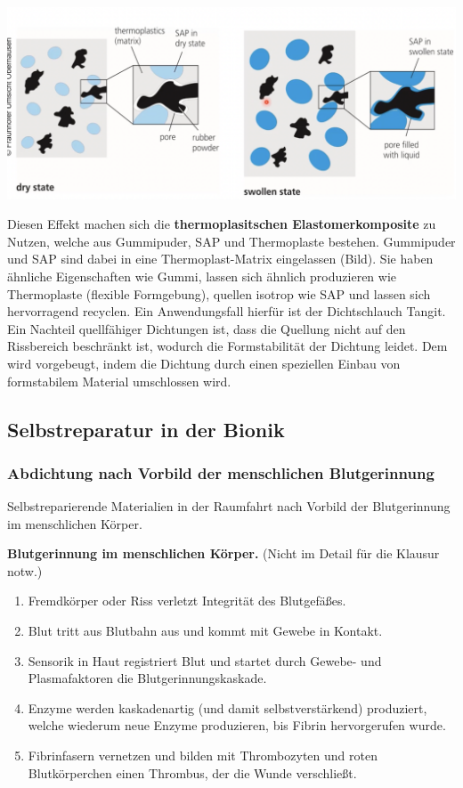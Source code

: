 \begin{center}
    \includegraphics[width=14cm]{lec5/figures/TPE.png}
\end{center}

Diesen Effekt machen sich die \textbf{thermoplasitschen Elastomerkomposite} zu Nutzen, welche aus Gummipuder, SAP und Thermoplaste bestehen. Gummipuder und SAP sind dabei in eine Thermoplast-Matrix eingelassen (Bild). Sie haben ähnliche Eigenschaften wie Gummi, lassen sich ähnlich produzieren wie Thermoplaste (flexible Formgebung), quellen isotrop wie SAP und lassen sich hervorragend recyclen. Ein Anwendungsfall hierfür ist der Dichtschlauch Tangit.\\

Ein Nachteil quellfähiger Dichtungen ist, dass die Quellung nicht auf den Rissbereich beschränkt ist, wodurch die Formstabilität der Dichtung leidet. Dem wird vorgebeugt, indem die Dichtung durch einen speziellen Einbau von formstabilem Material umschlossen wird.

\subsection{Selbstreparatur in der Bionik}

\subsubsection{Abdichtung nach Vorbild der menschlichen Blutgerinnung}

Selbstreparierende Materialien in der Raumfahrt nach Vorbild der Blutgerinnung im menschlichen Körper.

\textbf{Blutgerinnung im menschlichen Körper.} (Nicht im Detail für die Klausur notw.)

\begin{enumerate}
    \item Fremdkörper oder Riss verletzt Integrität des Blutgefäßes.
    \item Blut tritt aus Blutbahn aus und kommt mit Gewebe in Kontakt.
    \item Sensorik in Haut registriert Blut und startet durch Gewebe- und Plasmafaktoren die Blutgerinnungskaskade.
    \item Enzyme werden kaskadenartig (und damit selbstverstärkend) produziert, welche wiederum neue Enzyme produzieren, bis Fibrin hervorgerufen wurde.
    \item Fibrinfasern vernetzen und bilden mit Thrombozyten und roten Blutkörperchen einen Thrombus, der die Wunde verschließt.
\end{enumerate}

